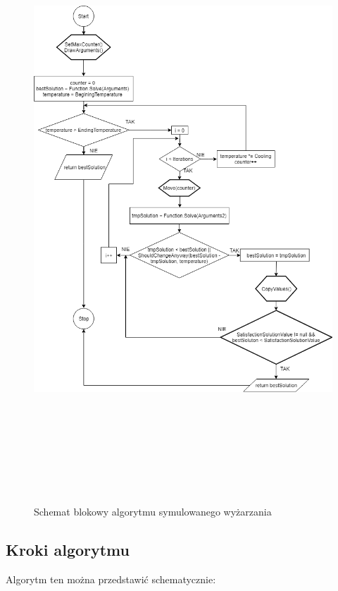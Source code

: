 \documentclass[twoside]{projektInzynierskiMS1}
\begin{document}
\begin{figure}[H]
		\includegraphics[height=22cm, width=16cm]{pics/blockDiagram.png}\\
	\caption{Schemat blokowy algorytmu symulowanego wyżarzania}
\end{figure}


		\subsection{Kroki algorytmu}
		
		Algorytm ten można przedstawić schematycznie:
\end{document}

